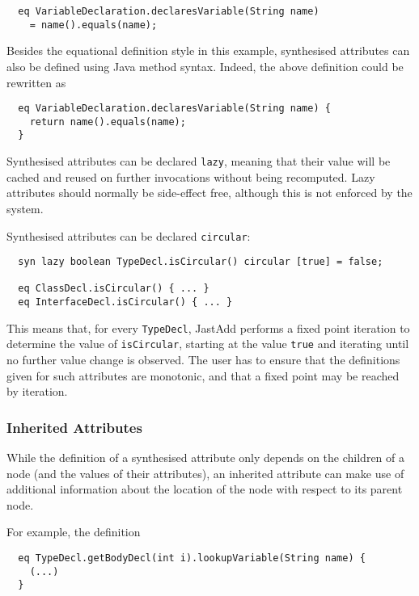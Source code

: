 \documentclass{article}
\newcommand{\nt}[1]{\texttt{#1}}
\newcommand{\code}[1]{\lstinline$#1$}
\begin{document}
\begin{lstlisting}
  eq VariableDeclaration.declaresVariable(String name) 
    = name().equals(name);
\end{lstlisting}

Besides the equational definition style in this example, synthesised attributes can also be defined using Java method syntax. Indeed, the above definition could be rewritten as

\begin{lstlisting}
  eq VariableDeclaration.declaresVariable(String name) {
    return name().equals(name);
  }
\end{lstlisting}

Synthesised attributes can be declared \code{lazy}, meaning that their value will be cached and reused on further invocations without being recomputed. Lazy attributes should normally be side-effect free, although this is not enforced by the system.

Synthesised attributes can be declared \code{circular}:

\begin{lstlisting}
  syn lazy boolean TypeDecl.isCircular() circular [true] = false;

  eq ClassDecl.isCircular() { ... }
  eq InterfaceDecl.isCircular() { ... }
\end{lstlisting}

This means that, for every \nt{TypeDecl}, JastAdd performs a fixed point iteration to determine the value of \code{isCircular}, starting at the value \code{true} and iterating until no further value change is observed. The user has to ensure that the definitions given for such attributes are monotonic, and that a fixed point may be reached by iteration.

\subsubsection{Inherited Attributes}
While the definition of a synthesised attribute only depends on the children of a node (and the values of their attributes), an inherited attribute can make use of additional information about the location of the node with respect to its parent node.

For example, the definition

\begin{lstlisting}
  eq TypeDecl.getBodyDecl(int i).lookupVariable(String name) {
    (...)
  }
\end{lstlisting}
\end{document}
